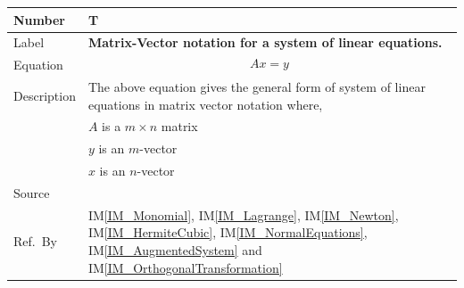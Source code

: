 \documentclass[12pt]{article}
\newcommand{\colAwidth}{0.13\textwidth}
\newcommand{\colBwidth}{0.82\textwidth}
\newcounter{theorynum} %
\newcommand{\iref}[1]{IM\ref{#1}}
\begin{document}

\noindent
\begin{minipage}{\textwidth}
	\renewcommand*{\arraystretch}{1.5}
	\begin{tabular}{| p{\colAwidth} | p{\colBwidth}|}
		\hline
		\rowcolor[gray]{0.9}
		Number& T{theorynum}\thetheorynum \label{T_LinearEqMatrix}\\
		\hline
		Label&\bf Matrix-Vector notation for a system of linear equations.\\
		\hline
		Equation& \begin{equation*}
		Ax = y
		\end{equation*} \\
		\hline
		Description & The above equation gives the general form of system of linear equations in matrix vector notation where,\\
		& $A$ is a $m \times n$ matrix\\
		& $y$ is an $m$-vector\\
		& $x$ is an $n$-vector\\
		\hline
		Source & ~\cite{Health1997}\\
		
		\hline
		Ref.\ By & \iref{IM_Monomial}, \iref{IM_Lagrange}, \iref{IM_Newton}, \iref{IM_HermiteCubic}, \iref{IM_NormalEquations}, \iref{IM_AugmentedSystem} and \iref{IM_OrthogonalTransformation}\\
		\hline
	\end{tabular}
\end{minipage}\\
~\newline
\end{document}
